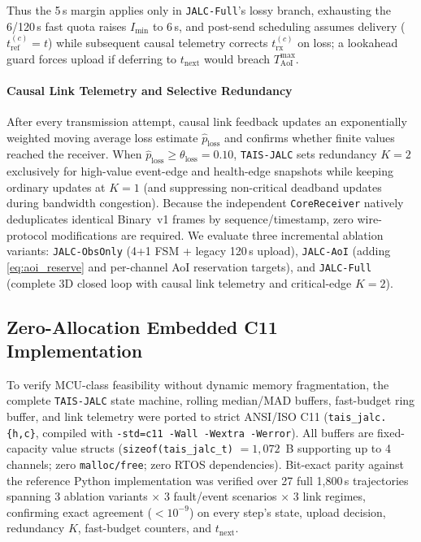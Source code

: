 \documentclass[journal,twoside,web]{ieeecolor}
\begin{document}
\noindent Thus the 5\,s margin applies only in \texttt{JALC-Full}'s lossy branch, exhausting the 6/120\,s fast quota raises $I_{\min}$ to 6\,s, and post-send scheduling assumes delivery ($t_{\text{ref}}^{(c)}{=}t$) while subsequent causal telemetry corrects $t_{\text{rx}}^{(c)}$ on loss; a lookahead guard forces upload if deferring to $t_{\text{next}}$ would breach $T_{\text{AoI}}^{\max}$.

\paragraph{Causal Link Telemetry and Selective Redundancy}
After every transmission attempt, causal link feedback updates an exponentially weighted moving average loss estimate $\hat{p}_{\text{loss}}$ and confirms whether finite values reached the receiver. When $\hat{p}_{\text{loss}} \ge \theta_{\text{loss}} = 0.10$, \texttt{TAIS-JALC} sets redundancy $K{=}2$ exclusively for high-value event-edge and health-edge snapshots while keeping ordinary updates at $K{=}1$ (and suppressing non-critical deadband updates during bandwidth congestion). Because the independent \texttt{CoreReceiver} natively deduplicates identical Binary~v1 frames by sequence/timestamp, zero wire-protocol modifications are required. We evaluate three incremental ablation variants: \texttt{JALC-ObsOnly} (4+1 FSM + legacy 120\,s upload), \texttt{JALC-AoI} (adding \eqref{eq:aoi_reserve} and per-channel AoI reservation targets), and \texttt{JALC-Full} (complete 3D closed loop with causal link telemetry and critical-edge $K{=}2$).

\subsection{Zero-Allocation Embedded C11 Implementation}
To verify MCU-class feasibility without dynamic memory fragmentation, the complete \texttt{TAIS-JALC} state machine, rolling median/MAD buffers, fast-budget ring buffer, and link telemetry were ported to strict ANSI/ISO C11 (\texttt{tais\_jalc.\{h,c\}}, compiled with \texttt{-std=c11 -Wall -Wextra -Werror}). All buffers are fixed-capacity value structs (\texttt{sizeof(tais\_jalc\_t)} $= 1{,}072$~B supporting up to 4 channels; zero \texttt{malloc/free}; zero RTOS dependencies). Bit-exact parity against the reference Python implementation was verified over 27 full 1,800\,s trajectories spanning 3 ablation variants $\times$ 3 fault/event scenarios $\times$ 3 link regimes, confirming exact agreement ($<10^{-9}$) on every step's state, upload decision, redundancy $K$, fast-budget counters, and $t_{\text{next}}$.
\end{document}
